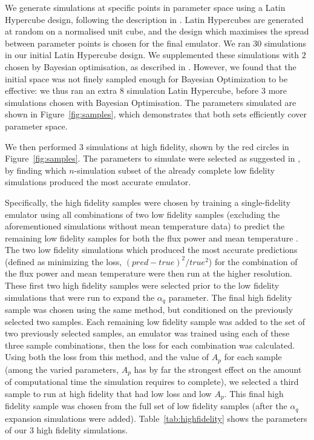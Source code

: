 \documentclass[a4paper,11pt]{article}
\begin{document}
We generate simulations at specific points in parameter space using a Latin Hypercube design, following the description in \cite{Bird:2019}. Latin Hypercubes are generated at random on a normalised unit cube, and the design which maximises the spread between parameter points is chosen for the final emulator. We ran $30$ simulations in our initial Latin Hypercube design. We supplemented these simulations with $2$ chosen by Bayesian optimisation, as described in \cite{Rogers:2019}. However, we found that the initial space was not finely sampled enough for Bayesian Optimization to be effective: we thus ran an extra $8$ simulation Latin Hypercube, before $3$ more simulations chosen with Bayesian Optimisation. The parameters simulated are shown in Figure~\ref{fig:samples}, which demonstrates that both sets efficiently cover parameter space.

We then performed $3$ simulations at high fidelity, shown by the red circles in Figure~\ref{fig:samples}. The parameters to simulate were selected as suggested in \cite{Ho:2022,Fernandez:2022}, by finding which $n$-simulation subset of the already complete low fidelity simulations produced the most accurate emulator.

Specifically, the high fidelity samples were chosen by training a single-fidelity emulator using all combinations of two low fidelity samples (excluding the aforementioned simulations without mean temperature data) to predict the remaining low fidelity samples for both the flux power and mean temperature \cite{Ho:2022}.
The two low fidelity simulations which produced the most accurate predictions (defined as minimizing the loss, $(pred - true)^2/true^2$) for the combination of the flux power and mean temperature were then run at the higher resolution.
These first two high fidelity samples were selected prior to the low fidelity simulations that were run to expand the $\alpha_q$ parameter.
The final high fidelity sample was chosen using the same method, but conditioned on the previously selected two samples.
Each remaining low fidelity sample was added to the set of two previously selected samples, an emulator was trained using each of these three sample combinations, then the loss for each combination was calculated.
Using both the loss from this method, and the value of $A_p$ for each sample (among the varied parameters, $A_p$ has by far the strongest effect on the amount of computational time the simulation requires to complete), we selected a third sample to run at high fidelity that had low loss and low $A_p$.
This final high fidelity sample was chosen from the full set of low fidelity samples (after the $\alpha_q$ expansion simulations were added). Table~\ref{tab:highfidelity} shows the parameters of our $3$ high fidelity simulations.
\end{document}
